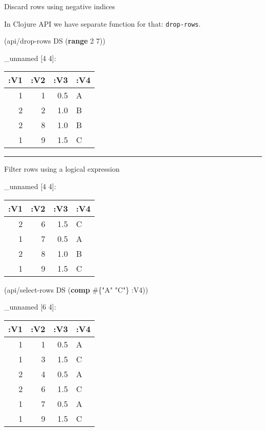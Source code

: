 \documentclass[]{article}
\newenvironment{Shaded}{\begin{snugshade}}{\end{snugshade}}
\newcommand{\KeywordTok}[1]{\textcolor[rgb]{0.13,0.29,0.53}{\textbf{#1}}}
\newcommand{\DecValTok}[1]{\textcolor[rgb]{0.00,0.00,0.81}{#1}}
\newcommand{\StringTok}[1]{\textcolor[rgb]{0.31,0.60,0.02}{#1}}
\newcommand{\VariableTok}[1]{\textcolor[rgb]{0.00,0.00,0.00}{#1}}
\newcommand{\AttributeTok}[1]{\textcolor[rgb]{0.77,0.63,0.00}{#1}}
\newcommand{\NormalTok}[1]{#1}
\begin{document}
Discard rows using negative indices

In Clojure API we have separate function for that: \texttt{drop-rows}.

\begin{Shaded}
\begin{Highlighting}[]
\NormalTok{(api/drop-rows DS (}\KeywordTok{range} \DecValTok{2} \DecValTok{7}\NormalTok{))}
\end{Highlighting}
\end{Shaded}

\_unnamed {[}4 4{]}:

\begin{longtable}[]{@{}rrrl@{}}
\toprule
:V1 & :V2 & :V3 & :V4\tabularnewline
\midrule
\endhead
1 & 1 & 0.5 & A\tabularnewline
2 & 2 & 1.0 & B\tabularnewline
2 & 8 & 1.0 & B\tabularnewline
1 & 9 & 1.5 & C\tabularnewline
\bottomrule
\end{longtable}

\begin{center}\rule{0.5\linewidth}{0.5pt}\end{center}

Filter rows using a logical expression

\begin{Shaded}
\end{Shaded}

\_unnamed {[}4 4{]}:

\begin{longtable}[]{@{}rrrl@{}}
\toprule
:V1 & :V2 & :V3 & :V4\tabularnewline
\midrule
\endhead
2 & 6 & 1.5 & C\tabularnewline
1 & 7 & 0.5 & A\tabularnewline
2 & 8 & 1.0 & B\tabularnewline
1 & 9 & 1.5 & C\tabularnewline
\bottomrule
\end{longtable}

\begin{Shaded}
\begin{Highlighting}[]
\NormalTok{(api/select-rows DS (}\KeywordTok{comp}\NormalTok{ #\{}\StringTok{"A"} \StringTok{"C"}\NormalTok{\} }\AttributeTok{:V4}\NormalTok{))}
\end{Highlighting}
\end{Shaded}

\_unnamed {[}6 4{]}:

\begin{longtable}[]{@{}rrrl@{}}
\toprule
:V1 & :V2 & :V3 & :V4\tabularnewline
\midrule
\endhead
1 & 1 & 0.5 & A\tabularnewline
1 & 3 & 1.5 & C\tabularnewline
2 & 4 & 0.5 & A\tabularnewline
2 & 6 & 1.5 & C\tabularnewline
1 & 7 & 0.5 & A\tabularnewline
1 & 9 & 1.5 & C\tabularnewline
\bottomrule
\end{longtable}
\end{document}
